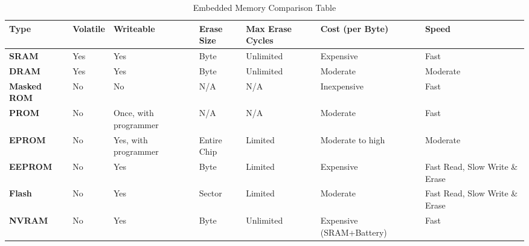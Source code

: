 \begin{table}[H]
\caption{Embedded Memory Comparison Table}
\label{table:mem-overview}
\begin{center}
\begin{adjustbox} {width=\textwidth}
    \begin{tabular} { | m{2cm} | m{2cm} | m{3cm} | m{2cm} | m{2cm} | m{3cm} | m{3cm} | }
        \hline
        \textbf{Type} & \textbf{Volatile} & \textbf{Writeable} & \textbf{Erase Size} & \textbf{Max
        Erase Cycles} & \textbf{Cost (per Byte)} & \textbf{Speed}\\
        \hline
        \textbf{SRAM} & Yes & Yes & Byte & Unlimited & Expensive & Fast\\
        \textbf{DRAM} & Yes & Yes & Byte & Unlimited & Moderate & Moderate\\
        \textbf{Masked ROM} & No & No & N/A & N/A & Inexpensive & Fast\\
        \textbf{PROM} & No & Once, with programmer & N/A & N/A & Moderate & Fast\\
        \textbf{EPROM} & No & Yes, with programmer & Entire Chip & Limited & Moderate to high & Moderate\\
        \textbf{EEPROM} & No & Yes & Byte & Limited & Expensive & Fast Read, Slow Write \& Erase\\
        \textbf{Flash} & No & Yes & Sector & Limited & Moderate & Fast Read, Slow Write \& Erase\\
        \textbf{NVRAM} & No & Yes & Byte & Unlimited & Expensive (SRAM+Battery) & Fast\\
        \hline
    \end{tabular}
\end{adjustbox}
\end{center}
\end{table}

